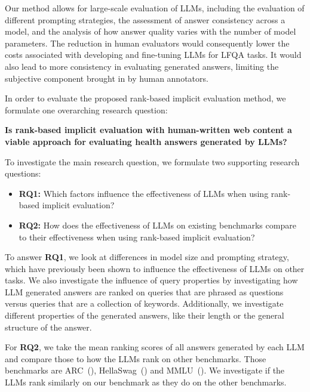 Our method allows for large-scale evaluation of LLMs, including the evaluation of different prompting strategies, the assessment of answer consistency across a model, and the analysis of how answer quality varies with the number of model parameters.
The reduction in human evaluators would consequently lower the costs associated with developing and fine-tuning LLMs for LFQA tasks.
It would also lead to more consistency in evaluating generated answers, limiting the subjective component brought in by human annotators.

In order to evaluate the proposed rank-based implicit evaluation method, we formulate one overarching research question:

\begin{center}
\textbf{Is rank-based implicit evaluation with human-written web content a viable approach for evaluating health answers generated by LLMs?}
\end{center}

To investigate the main research question, we formulate two supporting research questions:

\begin{itemize}
    \item \textbf{RQ1:} Which factors influence the effectiveness of LLMs when using rank-based implicit evaluation?
    \item \textbf{RQ2:} How does the effectiveness of LLMs on existing benchmarks compare to their effectiveness when using rank-based implicit evaluation?
\end{itemize}

To answer \textbf{RQ1}, we look at differences in model size and prompting strategy, which have previously been shown to influence the effectiveness of LLMs on other tasks.
We also investigate the influence of query properties by investigating how LLM generated answers are ranked on queries that are phrased as questions versus queries that are a collection of keywords.
Additionally, we investigate different properties of the generated answers, like their length or the general structure of the answer.

For \textbf{RQ2}, we take the mean ranking scores of all answers generated by each LLM and compare those to how the LLMs rank on other benchmarks.
Those benchmarks are ARC~(\cite{clark:2018:Think}), HellaSwag~(\cite{zellers:2019:HellaSwag}) and MMLU~(\cite{hendrycks:2020:Measuring}).
We investigate if the LLMs rank similarly on our benchmark as they do on the other benchmarks.

